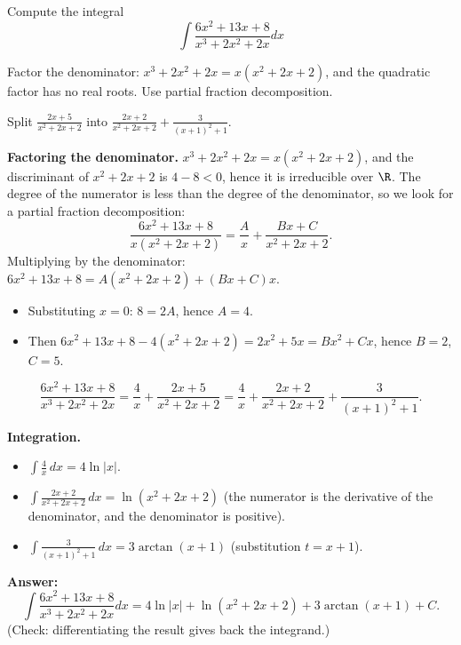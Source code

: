 
\begin{question}
Compute the integral
\[ \int\frac{6x^2+13x+8}{x^3+2x^2+2x}dx \]
\end{question}

\begin{hint}
Factor the denominator: $x^3+2x^2+2x=x(x^2+2x+2)$, and the quadratic factor has no real roots. Use partial fraction decomposition.
\end{hint}

\begin{hint}
Split $\frac{2x+5}{x^2+2x+2}$ into $\frac{2x+2}{x^2+2x+2}+\frac{3}{(x+1)^2+1}$.
\end{hint}

\begin{solution}
\textbf{Factoring the denominator.} $x^3+2x^2+2x=x(x^2+2x+2)$, and the discriminant of $x^2+2x+2$ is $4-8<0$, hence it is irreducible over $\R$. The degree of the numerator is less than the degree of the denominator, so we look for a partial fraction decomposition:
\[ \frac{6x^2+13x+8}{x(x^2+2x+2)}=\frac{A}{x}+\frac{Bx+C}{x^2+2x+2}. \]
Multiplying by the denominator: $6x^2+13x+8=A(x^2+2x+2)+(Bx+C)x$.
\begin{itemize}
  \item Substituting $x=0$: $8=2A$, hence $A=4$.
  \item Then $6x^2+13x+8-4(x^2+2x+2)=2x^2+5x=Bx^2+Cx$, hence $B=2$, $C=5$.
\end{itemize}
\[ \frac{6x^2+13x+8}{x^3+2x^2+2x}=\frac4x+\frac{2x+5}{x^2+2x+2}=\frac4x+\frac{2x+2}{x^2+2x+2}+\frac{3}{(x+1)^2+1}. \]

\textbf{Integration.}
\begin{itemize}
  \item $\int\frac4x\,dx=4\ln|x|$.
  \item $\int\frac{2x+2}{x^2+2x+2}\,dx=\ln(x^2+2x+2)$ (the numerator is the derivative of the denominator, and the denominator is positive).
  \item $\int\frac{3}{(x+1)^2+1}\,dx=3\arctan(x+1)$ (substitution $t=x+1$).
\end{itemize}

\textbf{Answer:}
\[ \int\frac{6x^2+13x+8}{x^3+2x^2+2x}dx=\boxed{4\ln|x|+\ln(x^2+2x+2)+3\arctan(x+1)+C}. \]
(Check: differentiating the result gives back the integrand.)
\end{solution}
